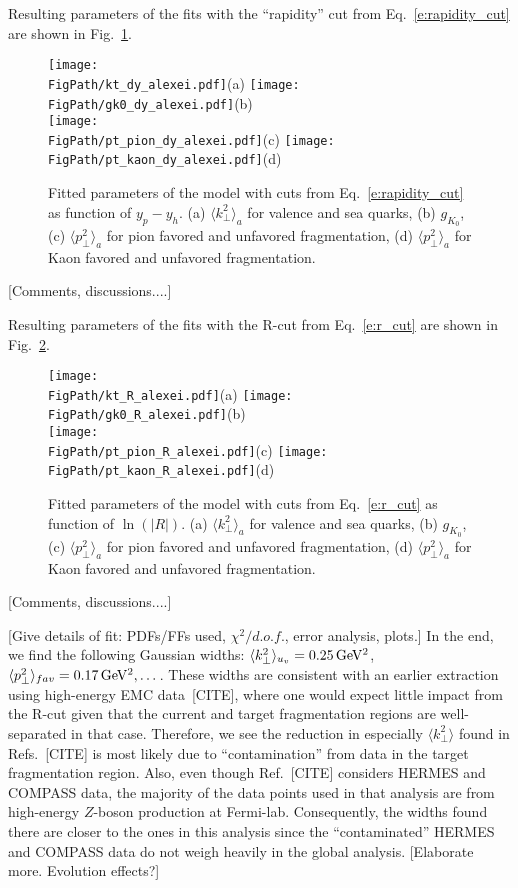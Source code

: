 \documentclass[final,3p,times,onecolumn,sort&compress,hidelinks]{elsarticle}
\newcommand*{\FigPath}{../Figs/}%
\begin{document}
\newpage
Resulting parameters of the fits with  the ``rapidity'' cut from Eq.~\eqref{e:rapidity_cut} 
are shown in Fig.~\ref{Fig:rapidity_cut}.
\begin{figure}[htb!]
\centering
\texttt{[image: \\FigPath/kt\_dy\_alexei.pdf]}{\tiny(a)}%
\texttt{[image: \\FigPath/gk0\_dy\_alexei.pdf]}{\tiny(b)}\\%
\texttt{[image: \\FigPath/pt\_pion\_dy\_alexei.pdf]}{\tiny(c)}%
\texttt{[image: \\FigPath/pt\_kaon\_dy\_alexei.pdf]}{\tiny(d)}%
\caption{\label{Fig:rapidity_cut}
Fitted parameters of the model with cuts from Eq.~\eqref{e:rapidity_cut} as function of $y_p-y_h$. (a) $\langle k_\perp^2 \rangle_a$ for valence and sea quarks,
(b) $g_{K_0}$,
(c) $\langle p_\perp^2 \rangle_a$ for pion favored and unfavored fragmentation, (d) $\langle p_\perp^2 \rangle_a$ for Kaon favored and unfavored fragmentation.
}
\end{figure}

[Comments, discussions....]
\newpage


Resulting parameters of the fits with  the R-cut from Eq.~\eqref{e:r_cut} 
are shown in Fig.~\ref{Fig:r_cut}.
\begin{figure}[htb!]
\centering
\texttt{[image: \\FigPath/kt\_R\_alexei.pdf]}{\tiny(a)}%
\texttt{[image: \\FigPath/gk0\_R\_alexei.pdf]}{\tiny(b)}\\%
\texttt{[image: \\FigPath/pt\_pion\_R\_alexei.pdf]}{\tiny(c)}%
\texttt{[image: \\FigPath/pt\_kaon\_R\_alexei.pdf]}{\tiny(d)}%
\caption{\label{Fig:r_cut}
Fitted parameters of the model with cuts from Eq.~\eqref{e:r_cut} as function of $\ln(|R|)$. (a) $\langle k_\perp^2 \rangle_a$ for valence and sea quarks,
(b) $g_{K_0}$,
(c) $\langle p_\perp^2 \rangle_a$ for pion favored and unfavored fragmentation, (d) $\langle p_\perp^2 \rangle_a$ for Kaon favored and unfavored fragmentation.
}
\end{figure}

[Comments, discussions....]
\newpage


[Give details of fit: PDFs/FFs used, $\chi^2/d.o.f.$, error analysis, plots.]  In the end, we find the following Gaussian widths: $\langle k_\perp^2\rangle_{u_v} = 0.25\,{\rm GeV^2}$, $\langle p_\perp^2\rangle_{fav} = 0.17\,{\rm GeV^2}, \dots$.  These widths are consistent with an earlier extraction using high-energy EMC data~[CITE], where one would expect little impact from the R-cut given that the current and target fragmentation regions are well-separated in that case.  Therefore, we see the reduction in especially $\langle k_\perp^2\rangle$ found in Refs.~[CITE] is most likely due to ``contamination'' from data in the target fragmentation region.  Also, even though Ref.~[CITE] considers HERMES and COMPASS data, the majority of the data points used in that analysis are from high-energy $Z$-boson production at Fermi-lab.  Consequently, the widths found there are closer to the ones in this analysis since the ``contaminated'' HERMES and COMPASS data do not weigh heavily in the global analysis.  [Elaborate more.  Evolution effects?]
\end{document}
